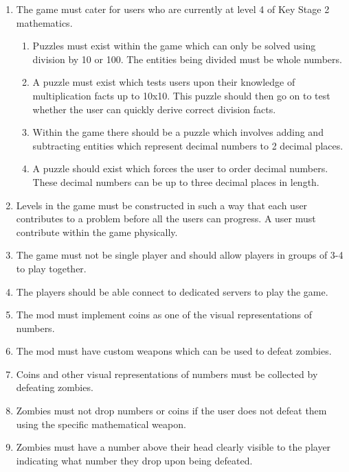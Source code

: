 \begin{enumerate}
		\item The game must cater for users who are currently at level 4 of Key Stage 2 mathematics.
		\begin{enumerate}[label={3.\arabic*},nolistsep,leftmargin=*]
			\item Puzzles must exist within the game which can only be solved using division by 10 or 100. The entities being divided must be whole numbers.
			\item A puzzle must exist which tests users upon their knowledge of multiplication facts up to 10x10. This puzzle should then go on to test whether the user can quickly derive correct division facts.
			\item Within the game there should be a puzzle which involves adding and subtracting entities which represent decimal numbers to 2 decimal places.
			\item A puzzle should exist which forces the user to order decimal numbers. These decimal numbers can be up to three decimal places in length.
		\end{enumerate}
		
	\item Levels in the game must be constructed in such a way that each user contributes to a problem before all the users can progress. A user must contribute within the game physically.
	\item The game must not be single player and should allow players in groups of 3-4 to play together.
	\item The players should be able connect to dedicated servers to play the game.
	
	\item The mod must implement coins as one of the visual representations of numbers.
	
	\item The mod must have custom weapons which can be used to defeat zombies.
	
	\item Coins and other visual representations of numbers must be collected by defeating zombies.
	
	\item Zombies must not drop numbers or coins if the user does not defeat them using the specific mathematical weapon.
	
	\item Zombies must have a number above their head clearly visible to the player indicating what number they drop upon being defeated.
	

\end{enumerate}
